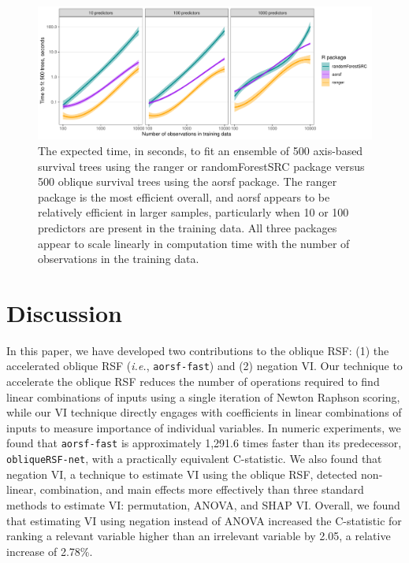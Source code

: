 \documentclass[12pt]{article}\usepackage[]{graphicx}\usepackage[]{xcolor}
\makeatletter
\def\maxwidth{ %
  \ifdim\Gin@nat@width>\linewidth
    \linewidth
  \else
    \Gin@nat@width
  \fi
}
\newenvironment{knitrout}{}{} %
\newcommand{\ie}{\textit{i.e.}}
\makeatother
\begin{document}
\begin{knitrout}
\color{fgcolor}\begin{figure}
\includegraphics[width=\maxwidth]{figure/bm_time_viz-1} \caption[The expected time, in seconds, to fit an ensemble of 500 axis-based survival trees using the ranger or randomForestSRC package versus 500 oblique survival trees using the aorsf package]{The expected time, in seconds, to fit an ensemble of 500 axis-based survival trees using the ranger or randomForestSRC package versus 500 oblique survival trees using the aorsf package. The ranger package is the most efficient overall, and aorsf appears to be relatively efficient in larger samples, particularly when 10 or 100 predictors are present in the training data. All three packages appear to scale linearly in computation time with the number of observations in the training data.}\label{fig:bm_time_viz}
\end{figure}

\end{knitrout}


\section{Discussion} \label{sec:discussion}

In this paper, we have developed two contributions to the oblique RSF: (1) the accelerated oblique RSF (\ie, \texttt{aorsf-fast}) and (2) negation VI. Our technique to accelerate the oblique RSF reduces the number of operations required to find linear combinations of inputs using a single iteration of Newton Raphson scoring, while our VI technique directly engages with coefficients in linear combinations of inputs to measure importance of individual variables. In numeric experiments, we found that \texttt{aorsf-fast} is approximately 1,291.6 times faster than its predecessor, \texttt{obliqueRSF-net}, with a practically equivalent C-statistic. We also found that negation VI, a technique to estimate VI using the oblique RSF, detected non-linear, combination, and main effects more effectively than three standard methods to estimate VI: permutation, ANOVA, and SHAP VI. Overall, we found that estimating VI using negation instead of ANOVA increased the C-statistic for ranking a relevant variable higher than an irrelevant variable by 2.05, a relative increase of 2.78\%.
\end{document}
